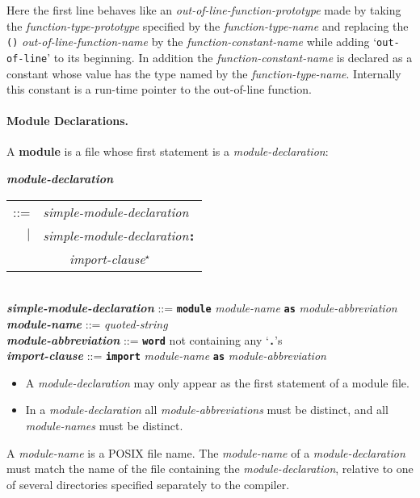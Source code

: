 \documentclass[12pt]{article}
\newcommand{\subsubsubsection}[1]{\paragraph[#1]{#1.}}
\newcommand{\TT}[1]{{\tt \bfseries #1}}
\newcommand{\STAR}{{\Large $^\star$}}
\newcommand{\key}[1]{{\rm \bfseries #1}}
\newcommand{\ttkey}[1]{{\tt \bfseries #1}}
\newcommand{\emkey}[1]{{\em \bfseries #1}}
\newenvironment{indpar}[1][0.3in]%
	{\begin{list}{}%
		     {\setlength{\itemsep}{0in}%
		      \setlength{\topsep}{0in}%
		      \setlength{\parsep}{1ex}%
		      \setlength{\labelwidth}{#1}%
		      \setlength{\leftmargin}{#1}%
		      \addtolength{\leftmargin}{\labelsep}}%
	 \item}%
	{\end{list}}
\begin{document}
Here the first line behaves like an {\em out-of-line-function-prototype}
made by taking the {\em function-type-prototype} specified by the
{\em function-type-name} and replacing the {\tt ()}
{\em out-of-line-function-name} by the {\em function-constant-name}
while adding `{\tt out-of-line}' to its beginning.  In addition
the {\em function-constant-name} is declared as a constant whose
value has the type named by the {\em function-type-name}.
Internally this constant is a run-time pointer to the out-of-line function.



\subsubsubsection{Module Declarations}
\label{MODULE-DECLARATIONS}

A \key{module} is a file whose first statement is a {\em module-declaration}:

\begin{indpar}
\emkey{module-declaration}\label{MODULE-DECLARATION}
    \begin{tabular}[t]{rl}
    ::= & {\em simple-module-declaration} \\
    $|$ & {\em simple-module-declaration}\TT{:} \\
	& \TT{~~~~}{\em import-clause}\STAR{} \\
    \end{tabular} \\
\emkey{simple-module-declaration} ::= \TT{module} {\em module-name}
        \TT{as} {\em module-abbreviation} \\
\emkey{module-name}\label{MODULE-NAME} ::= {\em quoted-string} \\
\emkey{module-abbreviation}\label{MODULE-ABBREVIATION}
	::= \TT{word} not containing any `\TT{.}'s \\
\emkey{import-clause}\label{IMPORT-CLAUSE}
    ::= \ttkey{import} {\em module-name} \TT{as} {\em module-abbreviation}

\begin{itemize}

\item
A {\em module-declaration} may only appear as the first statement
of a module file.

\item
In a {\em module-declaration} all {\em module-abbreviations} must be
distinct, and all {\em module-names} must be distinct.
\end{itemize}
\end{indpar}

A {\em module-name} is a POSIX file name.
The {\em module-name} of a {\em module-declaration} must match the
name of the file containing the
{\em module-declaration}, relative to one of several directories
specified separately to the compiler.
\end{document}
